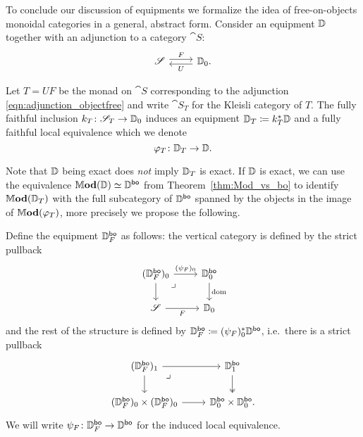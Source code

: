 \documentclass[11pt,oneside,article]{memoir}
\begin{document}
To conclude our discussion of equipments we formalize the idea of free-on-objects monoidal categories in a general, abstract form. Consider an equipment $\mathbb{D}$ together with an adjunction to a category $\cat{S}$:
\begin{equation}
      \label{eqn:adjunction_objectfree}
   \Adjoint{\cat{S}}{\dcat{D}_0.}{F}{U}
\end{equation}
\begin{definition}
   \label{def:kleisli equipment}
   Let $T=UF$ be the monad on $\cat{S}$ corresponding to the adjunction \eqref{eqn:adjunction_objectfree} and write $\cat{S}_T$ for the Kleisli category of $T$. The fully faithful inclusion $k_T\colon\mathscr{S}_T\to\mathbb{D}_0$ induces an equipment $\mathbb{D}_T\coloneqq k_T^*\mathbb{D}$ and a fully faithful local equivalence which we denote
   \begin{equation}
      \label{eqn:FFLE_DT}
      \varphi_T\colon \mathbb{D}_T\to\mathbb{D}.
   \end{equation}
\end{definition}
Note that $\mathbb{D}$ being exact does \emph{not} imply $\mathbb{D}_T$ is exact. If $\mathbb{D}$ is exact, we can use the equivalence $\mathbb{M}\mathbf{od}(\mathbb{D})\simeq\mathbb{D}^{\mathsf{bo}}$ from Theorem~\ref{thm:Mod_vs_bo} to identify $\mathbb{M}\mathbf{od}(\mathbb{D}_T)$ with the full subcategory of $\mathbb{D}^{\mathsf{bo}}$ spanned by the objects in the image of $\mathbb{M}\mathbf{od}(\varphi_T)$, more precisely we propose the following.
\begin{definition}
      \label{def:DFbo}
   Define the equipment $\mathbb{D}_F^{\mathsf{bo}}$ as follows: the vertical category is defined by the strict pullback
   \[ \begin{tikzcd}
      (\dcat{D}_F^{\bo})_0 \ar[d] \ar[dr,phantom,"\lrcorner" very near start] \ar[r,"(\psi_F)_0"]
         &\dcat{D}_0^{\bo} \ar[d,"\dom"] \\
     \cat{S} \ar[r,"F"']
         & \dcat{D}_0
   \end{tikzcd} \]
   and the rest of the structure is defined by
   $\mathbb{D}_F^{\mathsf{bo}}\coloneqq(\psi_F)_0^*\mathbb{D}^{\mathsf{bo}}$, i.e.\ there is a strict pullback
   \[ \begin{tikzcd}
      (\dcat{D}_F^{\bo})_1 \ar[r] \ar[dr,phantom,"\lrcorner" very near start] \ar[d]
         & \dcat{D}_1^{\bo} \ar[d,two heads] \\
      (\dcat{D}_F^{\bo})_0\times(\dcat{D}_F^{\bo})_0 \ar[r]
         & \dcat{D}_0^{\bo}\times\dcat{D}_0^{\bo}.
   \end{tikzcd} \]
   We will write $\psi_F\colon\mathbb{D}_F^{\mathsf{bo}}\to\mathbb{D}^{\mathsf{bo}}$ for the induced local equivalence.
\end{definition}
\end{document}
